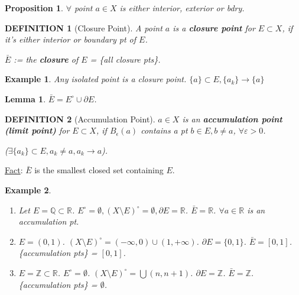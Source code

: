 \documentclass[12pt]{article}
\theoremstyle{blueplain}
\newtheorem{proposition}[theorem]{Proposition}
\newtheorem{lemma}[theorem]{Lemma}
\theoremstyle{bluedef}
\newtheorem{definition}{DEFINITION}[section]
\theoremstyle{blueremark}
\newtheorem{example}{Example}[section]
\newcommand{\R}{\mathbb{R}}
\newcommand{\Z}{\mathbb{Z}}
\newcommand{\Q}{\mathbb{Q}}
\newcommand{\eps}{\varepsilon}
\numberwithin{equation}{section}
\begin{document}
      \begin{proposition}
        $\forall$ point $a \in X$ is either interior, exterior or bdry.
      \end{proposition}

      \begin{definition}[Closure Point]
        A point $a$ is a \textbf{closure point} for $E \subset X$, if it's either interior or boundary pt of $E$.

        $\bar{E}$ := the \textbf{closure} of $E$ = \{all closure pts\}.
      \end{definition}

      \begin{example}
        Any isolated point is a closure point. $\{a\} \subset E, \{a_k\} \to \{a\}$
      \end{example}

      \begin{lemma}
        $\bar{E} = E^\circ \cup \partial E$.
      \end{lemma}

      \begin{definition}[Accumulation Point]
        $a \in X$ is an \textbf{accumulation point (limit point)} for $E \subset X$, if $B_\epsilon(a)$ contains a pt $b \in E, b \neq a$, $\forall \eps >0$.

        ($\exists \{a_k\} \subset E, a_k \neq a, a_k \to a$).
      \end{definition}


      \underline{Fact}:
    $\bar{E}$ is the smallest closed set containing $E$.


      \begin{example}
        \begin{enumerate}
          \item Let $E = \Q \subset \R$. $E^\circ = \emptyset, (X \setminus E)^\circ = \emptyset, \partial E = \R$. $\bar{E} = \R$.
                $\forall a \in \R$ is an accumulation pt.
          \item $E = (0, 1)$. $(X \setminus E)^\circ = (-\infty, 0) \cup (1, +\infty)$. $\partial E = \{0, 1\}$.
                $\bar{E} = [0, 1]$. \{accumulation pts\} = $[0, 1]$.
          \item $E = \Z \subset \R$. $E^\circ = \emptyset$. $(X \setminus E)^\circ = \bigcup (n, n+1)$. $\partial E = \Z$. $\bar{E} = \Z$. \{accumulation pts\} = $\emptyset$.
        \end{enumerate}
      \end{example}
\end{document}
